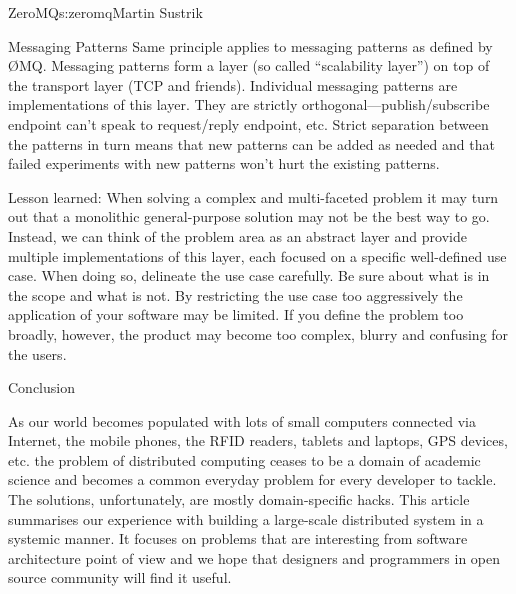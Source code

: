 \begin{aosachapter}{ZeroMQ}{s:zeromq}{Martin Sustrik}
\begin{aosasect1}{Messaging Patterns}
Same principle applies to messaging patterns as defined by
{\O}MQ. Messaging patterns form a layer (so called ``scalability layer'')
on top of the transport layer (TCP and friends). Individual messaging
patterns are implementations of this layer. They are strictly
orthogonal---publish/subscribe endpoint can't speak to request/reply
endpoint, etc. Strict separation between the patterns in turn means
that new patterns can be added as needed and that failed experiments
with new patterns won't hurt the existing patterns.

Lesson learned: When solving a complex and multi-faceted problem it
may turn out that a monolithic general-purpose solution may not be the
best way to go. Instead, we can think of the problem area as an
abstract layer and provide multiple implementations of this layer,
each focused on a specific well-defined use case. When doing so,
delineate the use case carefully. Be sure about what is in the scope
and what is not. By restricting the use case too aggressively the
application of your software may be limited. If you define the problem
too broadly, however, the product may become too complex, blurry and
confusing for the users.

\end{aosasect1}

\begin{aosasect1}{Conclusion}

As our world becomes populated with lots of small computers connected
via Internet, the mobile phones, the RFID readers, tablets and
laptops, GPS devices, etc. the problem of distributed computing ceases
to be a domain of academic science and becomes a common everyday
problem for every developer to tackle. The solutions, unfortunately,
are mostly domain-specific hacks. This article summarises our
experience with building a large-scale distributed system in a
systemic manner. It focuses on problems that are interesting from
software architecture point of view and we hope that designers and
programmers in open source community will find it useful.

\end{aosasect1}

\end{aosachapter}
